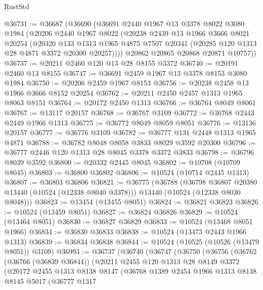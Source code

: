 \begin{lexlean}{RustStd}
\begin{coremodule}
@36731 := @36687
    (@36690
      (@36691
        @2440
        @1967
        @13
        @3378
        @8022
        @3080
        @1984
        (@20206
          @2440
          @1967
          @8022
          (@20238
            @2439
            @13
            @1966
            @3666
            @8021
            @20254
            (@20320
              @133
              @1313
              @1965
              @4875
              @7507
              @20341
              (@20285 @120 @1313 @28 @4871 @3372 @20300 @20257))))
        @20862
        @20865
        @20868
        @20871
        @10757))
@36737 := @20211 @2460 @120 @13 @28 @8155 @3372
@36740 := @20191 @2460 @13 @8155
@36747 := @36691 @2459 @1967 @13 @3378 @8153 @3080 @1984
@36750 := @20206 @2459 @1967 @8153
@36756 := @20238 @2458 @13 @1966 @3666 @8152 @20254
@36762 := @20211 @2450 @2457 @1313 @1965 @8063 @8151
@36764 := @20172 @2450 @1313
@36766 := @36764 @8049 @8061
@36767 := @13117 @20157
@36768 := @36767 @3109
@36772 := @36768 @2443 @2449 @1966 @1313
@36775 := @36772 @8049 @8059 @8051
@36776 := @13136 @20157
@36777 := @36776 @3109
@36782 := @36777 @131 @2448 @1313 @1965 @4871
@36788 := @36782 @8048 @8058 @3833 @8029 @3592 @20300
@36796 := @36777 @2446 @120 @1313 @28 @8045 @3378 @3372 @3833
@36798 := @36796 @8039 @3592
@36800 := @20332 @2445 @8045
@36802 := @10708 (@10709 @8045)
@36803 := @36800 @36802
@36806 := @10524 (@10714 @2445 @1313)
@36807 := @36803 @36806
@36821 := @36775
    (@36788
      (@36798 @36807 @20380 @13440 (@10524 (@12338 @8040 @3378)))
      @13440
      (@10524 (@12338 @8030 @8048)))
@36823 := @13454 (@13455 @8051)
@36824 := @36821 @36823
@36826 := @10524 (@13459 @8051)
@36827 := @36824 @36826
@36829 := @10524 (@13464 @8051)
@36830 := @36827 @36829
@36833 := @10524 (@13468 @8051 @1966)
@36834 := @36830 @36833
@36838 := @10524 (@13473 @2443 @1966 @1313)
@36839 := @36834 @36838
@36844 := @10524 (@10525 (@10526 (@13479 @8051)) @3109)
@36993 := @36737
    (@36740
      (@36747
        (@36750
          (@36756
            (@36762
              (@36766 (@36839 @36844))
              (@20211
                @2455
                @120
                @1313
                @28
                @8149
                @3372
                (@20172
                  @2455
                  @1313
                  @8138
                  @8147
                  (@36768
                    @1389
                    @2454
                    @1966
                    @1313
                    @8138
                    @8145
                    @5017
                    (@36777
                      @1317

\end{coremodule}
\end{lexlean}
